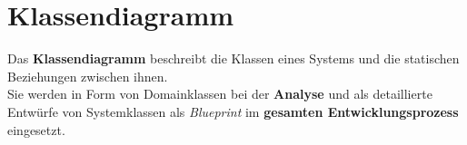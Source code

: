 \section{Klassendiagramm}

\begin{tcolorbox}[title=Klassendiagramm]
    Das \textbf{Klassendiagramm} beschreibt die Klassen eines Systems und die statischen Beziehungen zwischen ihnen.\\
    Sie werden in Form von Domainklassen bei der \textbf{Analyse} und als detaillierte Entwürfe von Systemklassen als \textit{Blueprint} im \textbf{gesamten Entwicklungsprozess} eingesetzt.

\end{tcolorbox}